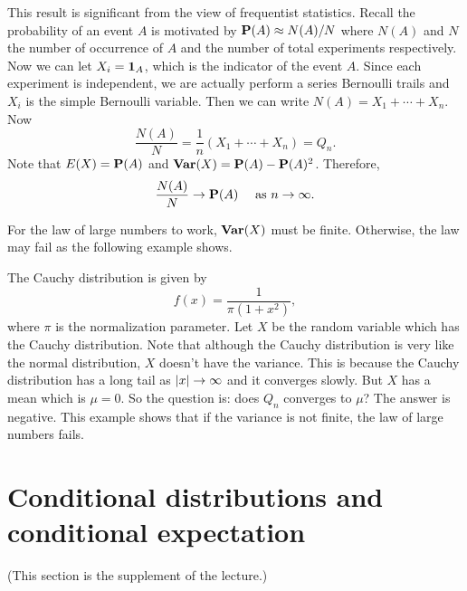 This result is significant from the view of frequentist statistics. Recall the probability of an event $A$ is motivated by $\mathbf{P}(A) \approx N(A) / N$ where $N(A)$ and $N$ the number of occurrence of $A$ and the number of total experiments respectively. Now we can let $X_i = \mathbf{1}_A$, which is the indicator of the event $A$. Since each experiment is independent, we are actually perform a series Bernoulli trails and $X_i$ is the simple Bernoulli variable. Then we can write $N(A) = X_1 + \cdots + X_n$. Now 
\begin{equation*}
    \frac{N(A)}{N} = \frac{1}{n} \left( X_1 + \cdots + X_n \right) = Q_n.
\end{equation*}
Note that $E(X) = \mathbf{P}(A)$ and $\mathbf{Var}(X) = \mathbf{P}(A) - \mathbf{P}(A)^2$. Therefore, 
\begin{equation*}
    \frac{N(A)}{N} \to \mathbf{P}(A) \quad \text{ as } n\to\infty.
\end{equation*}

\begin{caution}
For the law of large numbers to work, $\mathbf{Var}(X)$ must be finite. Otherwise, the law may fail as the following example shows.
\end{caution}

\begin{example}
The Cauchy distribution is given by
\begin{equation*}
    f(x) = \frac{1}{\pi (1+x^2)},
\end{equation*}
where $\pi$ is the normalization parameter. Let $X$ be the random variable which has the Cauchy distribution. Note that although the Cauchy distribution is very like the normal distribution, $X$ doesn't have the variance. This is because the Cauchy distribution has a long tail as $\left\vert x \right\vert\to\infty$ and it converges slowly. But $X$ has a mean which is $\mu = 0$. So the question is: does $Q_n$ converges to $\mu$? The answer is negative. This example shows that if the variance is not finite, the law of large numbers fails.
\end{example}



\section{Conditional distributions and conditional expectation}
(This section is the supplement of the lecture.)

